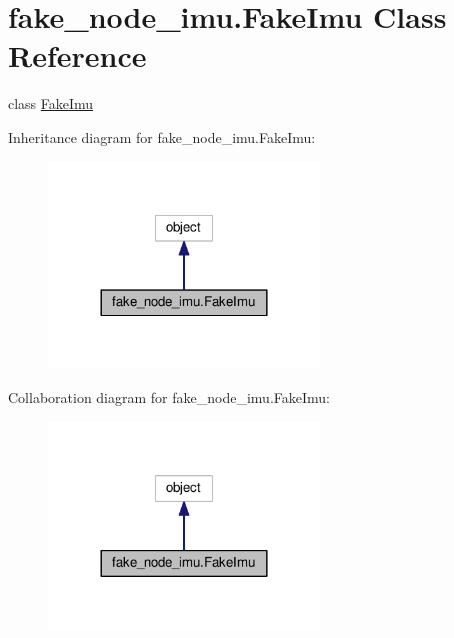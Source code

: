 \hypertarget{classfake__node__imu_1_1FakeImu}{}\section{fake\+\_\+node\+\_\+imu.\+Fake\+Imu Class Reference}
\label{classfake__node__imu_1_1FakeImu}


class \hyperlink{classfake__node__imu_1_1FakeImu}{Fake\+Imu}  




Inheritance diagram for fake\+\_\+node\+\_\+imu.\+Fake\+Imu\+:
\nopagebreak
\begin{figure}[H]
\begin{center}
\leavevmode
\includegraphics[width=204pt]{classfake__node__imu_1_1FakeImu__inherit__graph}
\end{center}
\end{figure}


Collaboration diagram for fake\+\_\+node\+\_\+imu.\+Fake\+Imu\+:
\nopagebreak
\begin{figure}[H]
\begin{center}
\leavevmode
\includegraphics[width=204pt]{classfake__node__imu_1_1FakeImu__coll__graph}
\end{center}
\end{figure}
